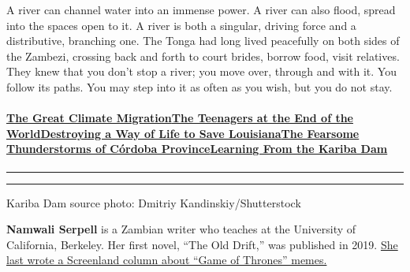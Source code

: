 A river can channel water into an immense power. A river can also flood,
spread into the spaces open to it. A river is both a singular, driving
force and a distributive, branching one. The Tonga had long lived
peacefully on both sides of the Zambezi, crossing back and forth to
court brides, borrow food, visit relatives. They knew that you don't
stop a river; you move over, through and with it. You follow its paths.
You may step into it as often as you wish, but you do not stay.

\hypertarget{the-great-climate-migrationthe-teenagers-at-the-end-of-the-worlddestroying-a-way-of-life-to-save-louisianathe-fearsome-thunderstorms-of-cuxf3rdoba-provincelearning-from-the-kariba-dam}{%
\paragraph{\texorpdfstring{\href{https://www.nytimes3xbfgragh.onion/interactive/2020/07/23/magazine/climate-migration.html}{The
Great Climate
Migration}\href{https://www.nytimes3xbfgragh.onion/interactive/2020/07/21/magazine/teenage-activist-climate-change.html}{The
Teenagers at the End of the
World}\href{https://www.nytimes3xbfgragh.onion/interactive/2020/07/21/magazine/louisiana-coast-engineering.html}{Destroying
a Way of Life to Save
Louisiana}\href{https://www.nytimes3xbfgragh.onion/interactive/2020/07/22/magazine/worst-storms-argentina.html}{The
Fearsome Thunderstorms of Córdoba
Province}\href{https://www.nytimes3xbfgragh.onion/interactive/2020/07/22/magazine/zambia-kariba-dam.html}{Learning
From the Kariba
Dam}}{The Great Climate MigrationThe Teenagers at the End of the WorldDestroying a Way of Life to Save LouisianaThe Fearsome Thunderstorms of Córdoba ProvinceLearning From the Kariba Dam}}\label{the-great-climate-migrationthe-teenagers-at-the-end-of-the-worlddestroying-a-way-of-life-to-save-louisianathe-fearsome-thunderstorms-of-cuxf3rdoba-provincelearning-from-the-kariba-dam}}

\begin{center}\rule{0.5\linewidth}{\linethickness}\end{center}

\begin{center}\rule{0.5\linewidth}{\linethickness}\end{center}

Kariba Dam source photo: Dmitriy Kandinskiy/Shutterstock

\textbf{Namwali Serpell} is a Zambian writer who teaches at the
University of California, Berkeley. Her first novel, ``The Old Drift,''
was published in 2019.
\href{https://www.nytimes3xbfgragh.onion/2019/06/06/magazine/old-town-road-meme-game-of-thrones.html}{She
last wrote a Screenland column about ``Game of Thrones'' memes.}

